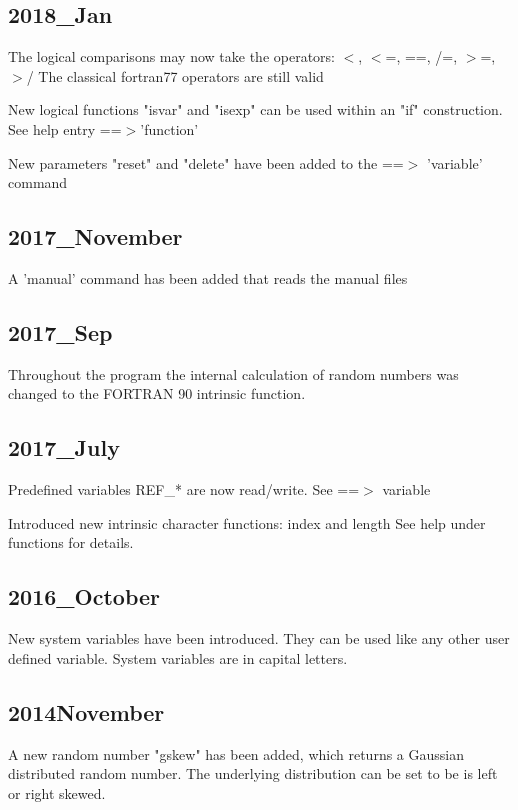 \subsection*{2018\_Jan}
\par
The logical comparisons may now take the operators: 
$ <$, $ <$=, ==, /=, $> $=, $> $/ 
The classical fortran77 operators are still valid 
\par
New logical functions "isvar" and "isexp" can be used within an 
"if" construction. See help entry ==$> $'function' 
\par
New parameters "reset" and "delete" have been added to the 
==$> $ 'variable' command 
\subsection*{2017\_November}
\par
A 'manual' command has been added that reads the manual files 
\subsection*{2017\_Sep}
\par
Throughout the program the internal calculation of random numbers 
was changed to the FORTRAN 90 intrinsic function. 
\subsection*{2017\_July}
\par
Predefined variables REF\_* are now read/write. See ==$> $ variable 
\par
Introduced new intrinsic character functions: index and length 
See help under functions for details. 
\subsection*{2016\_October}
\par
New system variables have been introduced. They can be used like any 
other user defined variable. System variables are in capital letters. 
\subsection*{2014November}
\par
A new random number "gskew" has been added, which returns a 
Gaussian distributed random number. The underlying distribution 
can be set to be is left or right skewed. 
